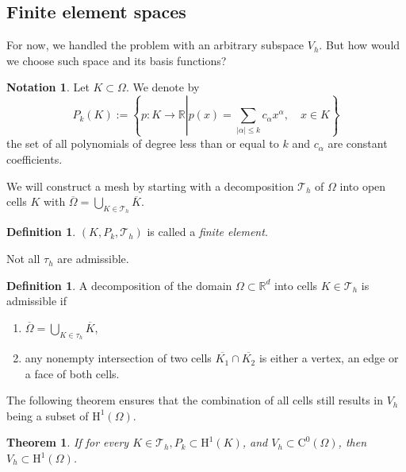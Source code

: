 \documentclass[12pt,a4paper,twoside, open=right]{scrreprt}
\theoremstyle{definition}
\newtheorem{defn}[auf]{Definition}
\newtheorem{notation}[auf]{Notation}
\theoremstyle{plain}
\newtheorem{sa}[auf]{Theorem}
\newcommand{\abs}[1]{\left\vert #1\right\vert}
\newcommand{\rr}{\mathbb{R}}
\begin{document}
\subsection{Finite element spaces}
\label{subsec:finitelem}
For now, we handled the problem with an arbitrary subspace $V_h$. But how would we choose such space and its basis functions?
\begin{notation}
    Let $K\subset \Omega$. We denote by
    \begin{equation}
        P_k(K):=\left\{p\colon K\to\rr\left\vert p(x)=\sum_{\abs{\alpha}\le k}c_\alpha x^\alpha,\right.\quad x\in K\right\}
    \end{equation}
    the set of all polynomials of degree less than or equal to $k$ and $c_\alpha$ are constant coefficients.
\end{notation}
We will construct a mesh by starting with a decomposition $\mathcal{T}_h$ of $\Omega$ into open cells $K$ with $\overline{\Omega}=\bigcup_{K\in\mathcal{T}_h}\overline{K}$.
\begin{defn}
    $(K,P_k,\mathcal{T}_h)$ is called a \emph{finite element}.
\end{defn}
   Not all $\tau_h$ are admissible.
\begin{defn}
    A decomposition of the domain $\Omega\subset\rr^d$ into cells $K\in\mathcal{T}_h$ is admissible if
    \begin{enumerate}
        \item $\overline{\Omega}=\bigcup_{K\in\tau_h}\overline{K}$,
        \item any nonempty intersection of two cells $\overline{K_1}\cap\overline{K_2}$ is either a vertex, an edge or a face of both cells.
    \end{enumerate}
\end{defn}
The following theorem ensures that the combination of all cells still results in $V_h$ being a subset of $\mathrm{H}^1(\Omega)$.
\begin{sa}
    If for every $K\in\mathcal{T}_h,P_k\subset \mathrm{H}^1(K)$, and $V_h\subset \mathrm{C}^0(\Omega)$, then $V_h\subset \mathrm{H}^1(\Omega)$.
\end{sa}
\end{document}
